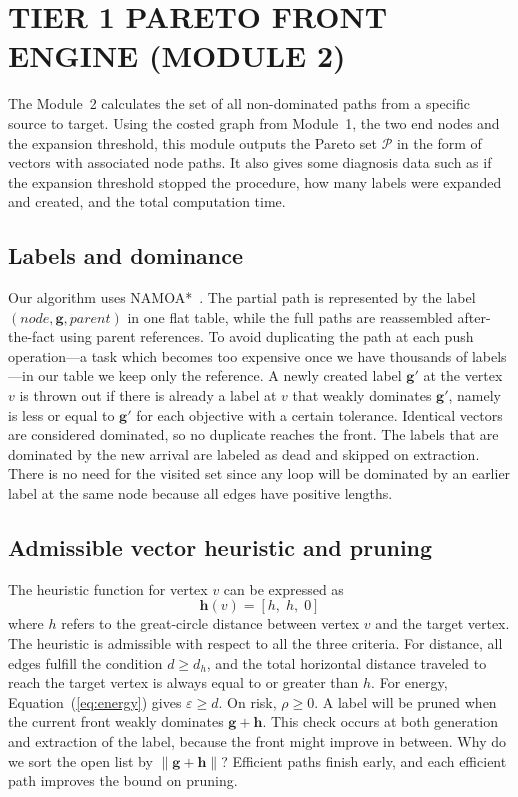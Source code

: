\section{TIER 1 PARETO FRONT ENGINE (MODULE 2)}\label{sec:m2}

The Module~2 calculates the set of all non-dominated paths from a specific source to
target. Using the costed graph from Module~1, the two end nodes and the expansion threshold, this module outputs the Pareto set
$\mathcal{P}$ in the form of vectors with associated node paths. It also gives some
diagnosis data such as if the expansion threshold stopped the procedure, how many labels
were expanded and created, and the total computation time.

\subsection{Labels and dominance}

Our algorithm uses NAMOA*~\cite{r17}. The partial path is represented by the label
$(\mathit{node}, \mathbf{g}, \mathit{parent})$ in one flat table, while the full paths
are reassembled after-the-fact using parent references. To avoid
duplicating the path at each push operation---a task which becomes too
expensive once we have thousands of labels---in our table we keep only the reference. A
newly created label $\mathbf{g}'$ at the vertex $v$ is thrown out if there is already a
label at $v$ that weakly dominates $\mathbf{g}'$, namely is less or equal to
$\mathbf{g}'$ for each objective with a certain tolerance. Identical vectors are considered dominated, so no duplicate reaches the front. The labels that are dominated by the new arrival are labeled as dead and skipped
on extraction. There is no need for the visited set since any loop will be dominated by
an earlier label at the same node because all edges have positive lengths.

\subsection{Admissible vector heuristic and pruning}

The heuristic function for vertex $v$ can be expressed as
\begin{equation}
  \mathbf{h}(v) = [h,\; h,\; 0]
\end{equation}
where $h$ refers to the great-circle distance between vertex $v$ and the target vertex.
The heuristic is admissible with respect to all the three criteria. For distance, all edges fulfill the condition $d \geq d_h$, and the total
horizontal distance traveled to reach the target vertex is always equal to or greater
than $h$. For energy, Equation~(\ref{eq:energy}) gives $\varepsilon \geq d$. On risk, $\rho \geq 0$. A label will
be pruned when the current front weakly dominates $\mathbf{g} + \mathbf{h}$. This check occurs at both generation and extraction of the label, because the front might improve in between. Why do we sort the open list by
$\lVert\mathbf{g} + \mathbf{h}\rVert$? Efficient paths finish early, and each efficient
path improves the bound on pruning.

